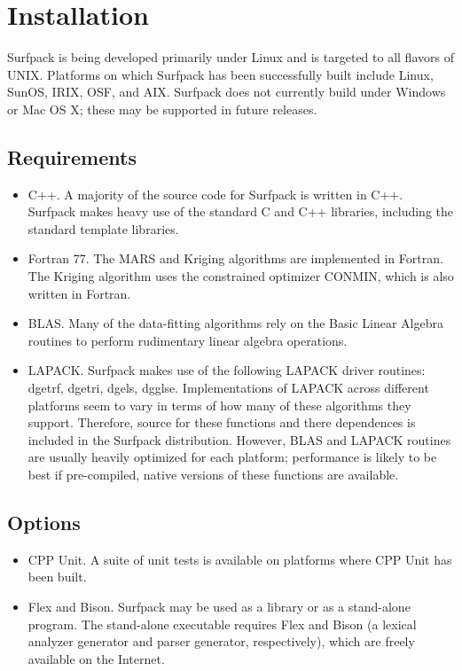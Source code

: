 \documentclass{article}
\begin{document}
\section{Installation}\label{sec:installation}
Surfpack is being developed primarily under Linux and is targeted to all flavors of UNIX.  Platforms on which Surfpack has been successfully built include Linux, SunOS, IRIX, OSF, and AIX.  Surfpack does not currently build under Windows or Mac OS X; these may be supported in future releases.
\subsection{Requirements}
\begin{itemize}
\item C++.  A majority of the source code for Surfpack is written in C++.  Surfpack makes heavy use of the standard C and C++ libraries, including the standard template libraries.
\item Fortran 77.  The MARS and Kriging algorithms are implemented in Fortran.  The Kriging algorithm uses the constrained optimizer CONMIN, which is also written in Fortran.  
\item BLAS.  Many of the data-fitting algorithms rely on the Basic Linear Algebra routines to perform rudimentary linear algebra operations.
\item LAPACK.  Surfpack makes use of the following LAPACK driver routines: dgetrf, dgetri, dgels, dgglse.  Implementations of LAPACK across different platforms seem to vary in terms of how many of these algorithms they support.  Therefore, source for these functions and there dependences is included in the Surfpack distribution.  However, BLAS and LAPACK routines are usually heavily optimized for each platform; performance is likely to be best if pre-compiled, native versions of these functions are available.
\end{itemize}
\subsection{Options}
\begin{itemize}
\item CPP Unit.  A suite of unit tests is available on platforms where CPP Unit has been built.
\item Flex and Bison. Surfpack may be used as a library or as a stand-alone program.  The stand-alone executable requires Flex and Bison (a lexical analyzer generator and parser generator, respectively), which are freely available on the Internet.
\end{itemize}
\end{document}
